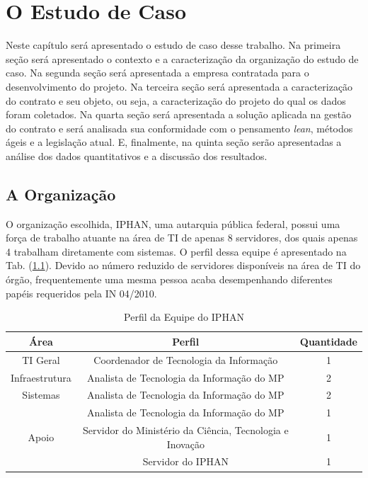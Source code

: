 \chapter[O Estudo de Caso]{O Estudo de Caso}

Neste capítulo será apresentado o estudo de caso desse trabalho. Na primeira seção será apresentado o contexto e a caracterização da organização do estudo de caso. Na segunda seção será apresentada a empresa contratada para o desenvolvimento do projeto. Na terceira seção será apresentada a caracterização do contrato e seu objeto, ou seja, a caracterização do projeto do qual os dados foram coletados. Na quarta seção será apresentada a solução aplicada na gestão do contrato e será analisada sua conformidade com o pensamento \textit{lean}, métodos ágeis e a legislação atual. E, finalmente, na quinta seção serão apresentadas a análise dos dados quantitativos e a discussão dos resultados.

\section[A Organização]{A Organização}

O organização escolhida, IPHAN, uma autarquia pública federal, possui uma força de trabalho atuante na área de TI de apenas 8 servidores, dos quais apenas 4 trabalham diretamente com sistemas. O perfil dessa equipe é apresentado na Tab. (\ref{piphan}). Devido ao número reduzido de servidores disponíveis na área de TI do órgão, frequentemente uma mesma pessoa acaba desempenhando diferentes papéis requeridos pela IN 04/2010.

\begin{table}[H]
\center
\footnotesize
\begin{tabular}{|c|c|c|}
\hline
\textbf{Área}          & \textbf{Perfil}   & \textbf{Quantidade} \\ \hline
TI Geral               & Coordenador de Tecnologia da Informação   & 1                   \\ \hline
Infraestrutura         & Analista de Tecnologia da Informação do MP   & 2                   \\ \hline
Sistemas               & Analista de Tecnologia da Informação do MP   & 2                   \\ \hline
\multirow{3}{*}{Apoio} & Analista de Tecnologia da Informação do MP   & 1                   \\ \cline{2-3} 
\multicolumn{1}{|l|}{} & Servidor do Ministério da Ciência, Tecnologia e Inovação & 1                   \\ \cline{2-3} 
\multicolumn{1}{|l|}{} & Servidor do IPHAN & 1                   \\ \hline
\end{tabular}
\caption{Perfil da Equipe do IPHAN}
\label{piphan}
\end{table}

